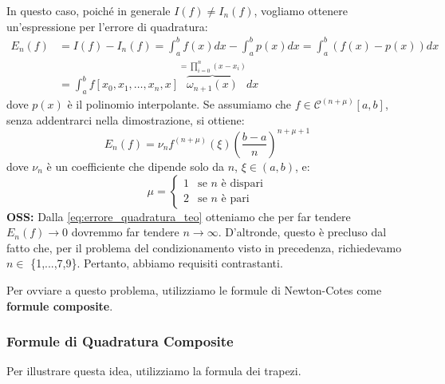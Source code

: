 In questo caso, poiché in generale $I(f) \neq I_n(f)$, vogliamo ottenere un'espressione per l'errore di quadratura:
\begin{equation} \label{eq:errore_quadratura_def}
    \begin{split}
    E_n(f) &= I(f) - I_n(f) = \int_{a}^{b} f(x) dx - \int_{a}^{b} p(x) dx = \int_{a}^{b} (f(x) - p(x)) dx \\[2ex]
    &= \int_{a}^{b} f[x_0, x_1, \dots, x_n, x] \overbrace{\omega_{n+1}(x)}^{= \prod_{i=0}^{n} (x-x_i)} dx
    \end{split}
\end{equation}
dove $p(x)$ è il polinomio interpolante. 
Se assumiamo che $f \in \mathcal{C}^{(n+\mu)}[a,b]$, senza addentrarci nella dimostrazione, si ottiene:
\begin{equation} \label{eq:errore_quadratura_teo}
E_n(f) = \nu_n f^{(n+\mu)}(\xi) \left( \frac{b-a}{n} \right)^{n+\mu+1}
\end{equation}
dove $\nu_n$ è un coefficiente che dipende solo da $n$, $\xi \in (a,b)$, e:
\begin{equation}
\mu = 
\begin{cases} 
1 & \text{se } n \text{ è dispari} \\ 
2 & \text{se } n \text{ è pari} 
\end{cases}
\end{equation}
\textbf{OSS:} Dalla \eqref{eq:errore_quadratura_teo} otteniamo che per far tendere $E_n(f) \to 0$ dovremmo far tendere $n \to \infty$. D'altronde, questo è precluso dal fatto che, per il problema del condizionamento visto in precedenza, richiedevamo $n \in $ \{1,...,7,9\}. Pertanto, abbiamo requisiti contrastanti.

Per ovviare a questo problema, utilizziamo le formule di Newton-Cotes come \textbf{formule composite}.

\vspace{0.6cm}
\subsubsection*{Formule di Quadratura Composite}

Per illustrare questa idea, utilizziamo la formula dei trapezi.

